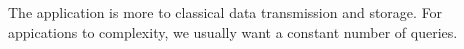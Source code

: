 The application is more to classical data transmission and storage. For appications to complexity, we usually want a constant number of queries.





